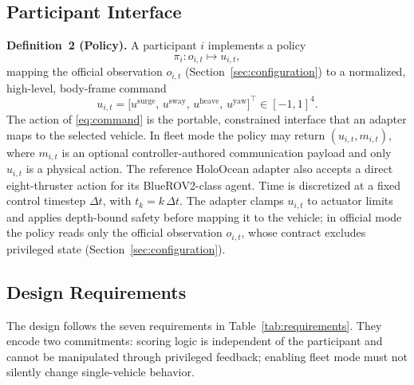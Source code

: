 \subsection{Participant Interface}

\noindent\textbf{Definition~2 (Policy).} A participant $i$ implements a policy
\begin{equation}
\label{eq:policy}
\pi_i: o_{i,t}\mapsto u_{i,t},
\end{equation}
mapping the official observation $o_{i,t}$ (Section~\ref{sec:configuration}) to a normalized, high-level, body-frame command
\begin{equation}
\label{eq:command}
u_{i,t}=\big[u^{\mathrm{surge}},\,u^{\mathrm{sway}},\,u^{\mathrm{heave}},\,u^{\mathrm{yaw}}\big]^{\!\top}\in[-1,1]^4 .
\end{equation}
The action of \eqref{eq:command} is the portable, constrained interface that an adapter maps to the selected vehicle. In fleet mode the policy may return $(u_{i,t},m_{i,t})$, where $m_{i,t}$ is an optional controller-authored communication payload and only $u_{i,t}$ is a physical action. The reference HoloOcean adapter also accepts a direct eight-thruster  action for its BlueROV2-class agent. Time is discretized at a fixed control timestep $\Delta t$, with $t_k=k\,\Delta t$. The adapter clamps $u_{i,t}$ to actuator limits and applies depth-bound safety before mapping it to the vehicle; in official mode the policy reads only the official observation $o_{i,t}$, whose contract excludes privileged state (Section~\ref{sec:configuration}).

\subsection{Design Requirements}

The design follows the seven requirements in Table~\ref{tab:requirements}. They encode two commitments: scoring logic is independent of the participant and cannot be manipulated through privileged feedback; enabling fleet mode must not silently change single-vehicle behavior.

